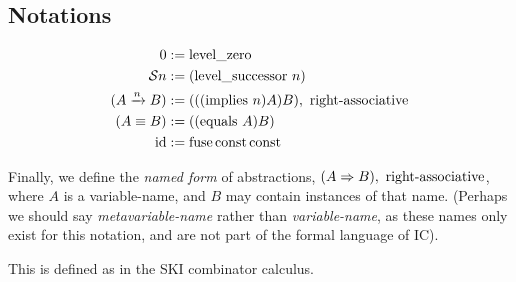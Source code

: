 \documentclass{article}
\begin{document}
  \subsection{Notations}


  \newcommand{\ic}[1]{#1}
  
  
  \newcommand{\equals}{\equiv}

  \begin{align*}
    \lzero &:= \mathrm{level\_zero}\\
    \lsucc{n} &:= (\mathrm{level\_successor}\ n)\\
    (A \implies{n} B) &:= (((\mathrm{implies}\ n) A) B),\ \operatorname{right-associative}\\
    (A \equals B) &:= ((\mathrm{equals}\ A) B)\\
    \id &:= \fuse \const \const\\
  \end{align*}

  Finally, we define the \emph{named form} of abstractions, $(\nameabst{A}B),\ \operatorname{right-associative}$, where $A$ is a variable-name, and $B$ may contain instances of that name. (Perhaps we should say \emph{metavariable-name} rather than \emph{variable-name}, as these names only exist for this notation, and are not part of the formal language of IC).
  
  This is defined as in the SKI combinator calculus.
\end{document}
